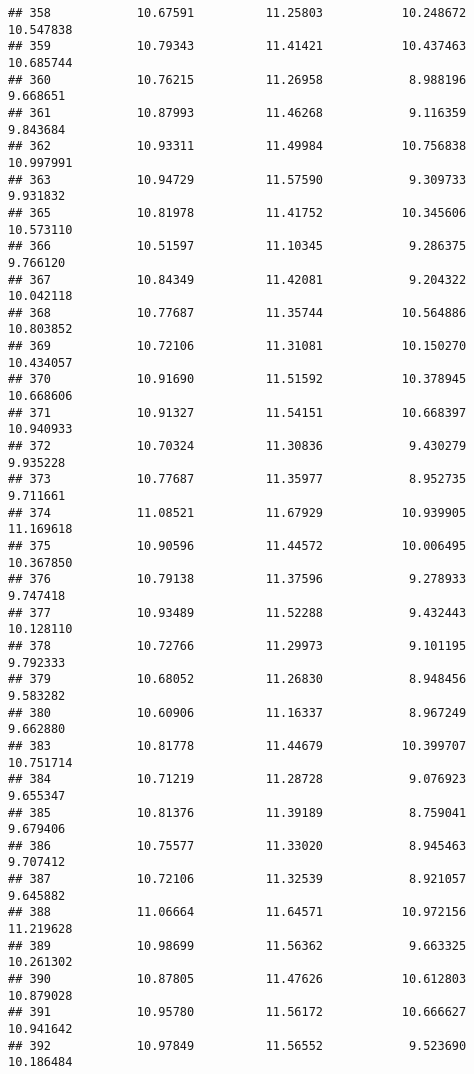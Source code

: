 \documentclass[
]{article}
\begin{document}
\begin{verbatim}
## 358            10.67591          11.25803           10.248672         10.547838
## 359            10.79343          11.41421           10.437463         10.685744
## 360            10.76215          11.26958            8.988196          9.668651
## 361            10.87993          11.46268            9.116359          9.843684
## 362            10.93311          11.49984           10.756838         10.997991
## 363            10.94729          11.57590            9.309733          9.931832
## 365            10.81978          11.41752           10.345606         10.573110
## 366            10.51597          11.10345            9.286375          9.766120
## 367            10.84349          11.42081            9.204322         10.042118
## 368            10.77687          11.35744           10.564886         10.803852
## 369            10.72106          11.31081           10.150270         10.434057
## 370            10.91690          11.51592           10.378945         10.668606
## 371            10.91327          11.54151           10.668397         10.940933
## 372            10.70324          11.30836            9.430279          9.935228
## 373            10.77687          11.35977            8.952735          9.711661
## 374            11.08521          11.67929           10.939905         11.169618
## 375            10.90596          11.44572           10.006495         10.367850
## 376            10.79138          11.37596            9.278933          9.747418
## 377            10.93489          11.52288            9.432443         10.128110
## 378            10.72766          11.29973            9.101195          9.792333
## 379            10.68052          11.26830            8.948456          9.583282
## 380            10.60906          11.16337            8.967249          9.662880
## 383            10.81778          11.44679           10.399707         10.751714
## 384            10.71219          11.28728            9.076923          9.655347
## 385            10.81376          11.39189            8.759041          9.679406
## 386            10.75577          11.33020            8.945463          9.707412
## 387            10.72106          11.32539            8.921057          9.645882
## 388            11.06664          11.64571           10.972156         11.219628
## 389            10.98699          11.56362            9.663325         10.261302
## 390            10.87805          11.47626           10.612803         10.879028
## 391            10.95780          11.56172           10.666627         10.941642
## 392            10.97849          11.56552            9.523690         10.186484

\end{verbatim}
\end{document}
